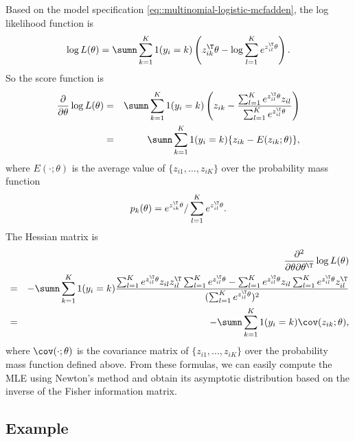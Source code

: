 Based on the model specification \eqref{eq::multinomial-logistic-mcfadden}, the log likelihood function is
$$
\log L(\theta) 
= \sumn \sum_{k=1}^K 1(y_i = k)  \left(  z_{ik}^{\T}\theta -   \log \sum_{ l =1}^{K}e^{ z_{i l }^{\T}\theta }   \right).
$$
So the score function is
\begin{eqnarray*}
\frac{\partial }{ \partial \theta } \log L(\theta) 
&=& \sumn \sum_{k=1}^K 1(y_i = k)    \left(  z_{ik}  -   
\frac{   \sum_{ l =1}^{K}e^{ z_{i l }^{\T}\theta }  z_{i l } }{\sum_{ l =1}^{K}e^{ z_{i l }^{\T}\theta }  } \right) \\
&=& \sumn \sum_{k=1}^K 1(y_i = k)    \{  z_{ik}  -  E(z_{ik};\theta)    \},
\end{eqnarray*}
where $E(\cdot; \theta) $ is the average value of $\{ z_{i1}, \ldots, z_{iK} \}$ over the probability mass function
$$
p_k(\theta) = e^{z_{ik}^{\T}\theta} / \sum_{ l =1}^{K}e^{ z_{i l }^{\T}\theta }.
$$
The Hessian matrix is
\begin{eqnarray*}
&&\frac{\partial^2 }{ \partial \theta\partial \theta^{\T}  } \log L(\theta)  \\
&=& - \sumn \sum_{k=1}^K 1(y_i = k)  
\frac{   \sum_{ l =1}^{K}e^{ z_{i l }^{\T}\theta }  z_{i l } z_{i l }^{\T}\sum_{ l =1}^{K}e^{ z_{i l }^{\T}\theta }
- \sum_{ l =1}^{K}e^{ z_{i l }^{\T}\theta }  z_{i l } \sum_{ l =1}^{K}e^{ z_{i l }^{\T}\theta }  z_{i l }^{\T}
 }{  (\sum_{ l =1}^{K}e^{ z_{i l }^{\T}\theta })^2  }  \\
 &=& - \sumn \sum_{k=1}^K 1(y_i = k)   \cov(z_{ik}; \theta),
\end{eqnarray*}
where $\cov(\cdot; \theta) $ is the covariance matrix of $\{ z_{i1}, \ldots, z_{iK} \}$ over the probability mass function defined above. 
From these formulas, we can easily compute the MLE using Newton's method and obtain its asymptotic distribution based on the inverse of the Fisher information matrix. 

\subsection{Example}

